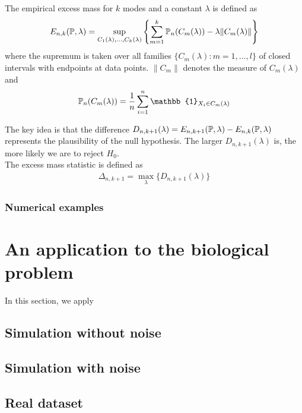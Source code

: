 The empirical excess mass for $k$ modes and a constant $\lambda$ is defined as
\begin{align*}
    E_{n,k}(\mathbb{P}, \lambda) = \sup_{C_1(\lambda), \ldots, C_k(\lambda)}
    \left\{
    \sum_{m = 1}^k \mathbb{P}_n(C_m(\lambda))-\lambda\| C_m(\lambda)\|
    \right\}
\end{align*}
where the supremum is taken over all families $\{ C_m(\lambda) : m = 1, \ldots, l\}$ of closed intervals with endpoints at data points. $\|C_m\|$ denotes the measure of $C_m(\lambda)$ and 
\begin{align*}
    \PP_n(C_m(\lambda)) 
    = \frac{1}{n}\sum_{i = 1}^n
    \mathbb{1}_{X_i \in C_m(\lambda)}
\end{align*}

The key idea is that the difference $D_{n, k+1}(\lambda) = E_{n,k+1}(\mathbb{P}, \lambda) - E_{n,k}(\mathbb{P}, \lambda)$ represents the plausibility of the null hypothesis. The larger $D_{n, k+1}(\lambda)$ is, the more likely we are to reject $H_0$. \\

The excess mass statistic is defined as 
\begin{align*}
    \Delta_{n, k+1} = \max_{\lambda}\{D_{n, k+1}(\lambda)\}
\end{align*}

\subsubsection{Numerical examples}

\section{An application to the biological problem}
In this section, we apply 
\label{s:multimod_application}
\subsection{Simulation without noise}
\subsection{Simulation with noise}
\subsection{Real dataset}